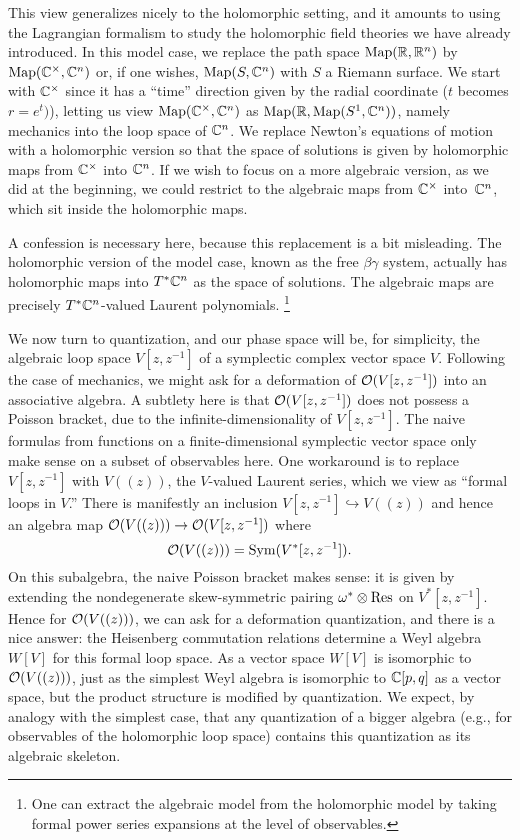 \documentclass[11pt]{amsart}
\begin{document}
This view generalizes nicely to the holomorphic setting,
and it amounts to using the Lagrangian formalism to study the holomorphic field theories we have already introduced.
In this model case, we replace the path space ${\rm Map}(\mathbb R, \mathbb R^n)$ by ${\rm Map}(\mathbb C^\times, \mathbb C^n)$ or, if one wishes, ${\rm Map}(S, \mathbb C^n)$ with $S$ a Riemann surface.
We start with $\mathbb C^\times$ since it has a ``time'' direction given by the radial coordinate ($t$ becomes $r = e^t)$),
letting us view ${\rm Map}(\mathbb C^\times, \mathbb C^n)$ as  ${\rm Map}(\mathbb R, {\rm Map}(S^1,\mathbb C^n))$, namely mechanics into the loop space of $\mathbb C^n$.
We replace Newton's equations of motion with a holomorphic version
so that the space of solutions is given by holomorphic maps from $\mathbb C^\times$ into $\mathbb C^n$.
If we wish to focus on a more algebraic version, as we did at the beginning,
we could restrict to the algebraic maps from $\mathbb C^\times$ into~$\mathbb C^n$,
which sit inside the holomorphic maps.

A confession is necessary here, because this replacement is a bit misleading.
The holomorphic version of the model case, known as the free $\beta\gamma$ system,
actually has holomorphic maps into $T^* \mathbb C^n$ as the space of solutions.
The algebraic maps are precisely $T^* \mathbb C^n$-valued Laurent polynomials.
\footnote{One can extract the algebraic model from the holomorphic model by taking formal power series expansions at the level of observables.}

We now turn to quantization, and our phase space will be, for simplicity, the algebraic loop space $V[z,z^{-1}]$ of a symplectic complex vector space $V$.
Following the case of mechanics, we might ask for a deformation of $\mathcal O(V[z,z^{-1}])$ into an associative algebra.
A subtlety here is that $\mathcal O(V[z,z^{-1}])$ does not possess a Poisson bracket, 
due to the  infinite-dimensionality of $V[z,z^{-1}]$.
The naive formulas from functions on a finite-dimensional symplectic vector space only make sense on a subset of observables here.
One workaround is to replace $V[z,z^{-1}]$ with $V((z))$, the $V$-valued Laurent series,
which we view as ``formal loops in $V$.''
There is manifestly an inclusion $V[z,z^{-1}] \hookrightarrow V((z))$ and hence an algebra map $\mathcal O(V((z))) \to \mathcal O(V[z,z^{-1}])$
where 
\[
\mathcal O(V((z))) = \operatorname{Sym}(V^* [z,z^{-1}]).
\]
On this subalgebra, the naive Poisson bracket makes sense: it is given by extending the nondegenerate skew-symmetric pairing $\omega^* \otimes {\rm Res}$ on $V^* [z,z^{-1}]$.
Hence for $\mathcal O(V((z)))$, we can ask for a deformation quantization,
and there is a nice answer: 
the Heisenberg commutation relations determine a Weyl algebra $W[V]$ for this formal loop space.
As a vector space $W[V]$ is isomorphic to $\mathcal O(V((z)))$, 
just as the simplest Weyl algebra is isomorphic to $\mathbb C[p,q]$ as a vector space,
but the product structure is modified by quantization.
We expect, by analogy with the simplest case, that any quantization of a bigger algebra (e.g., for observables of the holomorphic loop space) contains this quantization as its algebraic skeleton.
\end{document}
